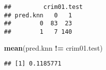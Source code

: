 \documentclass[]{article}
\newenvironment{Shaded}{\begin{snugshade}}{\end{snugshade}}
\newcommand{\KeywordTok}[1]{\textcolor[rgb]{0.13,0.29,0.53}{\textbf{#1}}}
\newcommand{\StringTok}[1]{\textcolor[rgb]{0.31,0.60,0.02}{#1}}
\newcommand{\OperatorTok}[1]{\textcolor[rgb]{0.81,0.36,0.00}{\textbf{#1}}}
\newcommand{\NormalTok}[1]{#1}
\begin{document}
\begin{verbatim}
##         crim01.test
## pred.knn   0   1
##        0  83  23
##        1   7 140
\end{verbatim}

\begin{Shaded}
\begin{Highlighting}[]
\KeywordTok{mean}\NormalTok{(pred.knn }\OperatorTok{!=}\StringTok{ }\NormalTok{crim01.test)}
\end{Highlighting}
\end{Shaded}

\begin{verbatim}
## [1] 0.1185771
\end{verbatim}
\end{document}
